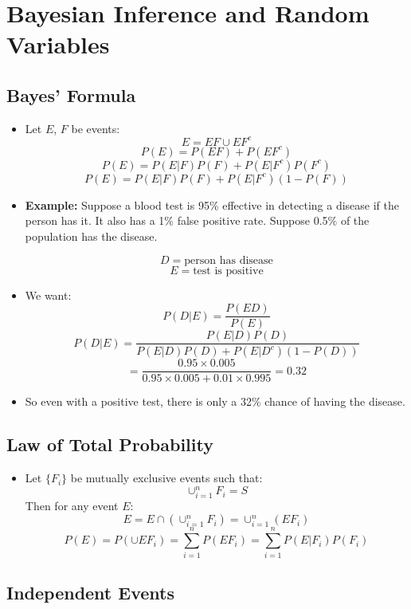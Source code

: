 \section{Bayesian Inference and Random Variables}

\subsection{Bayes' Formula}

\begin{itemize}
    \item Let $E$, $F$ be events:
          \[ E = EF \cup EF^c \]
          \[ P(E) = P(EF) + P(EF^c) \]
          \[ P(E) = P(E|F)P(F) + P(E|F^c)P(F^c) \]
          \[ P(E) = P(E|F)P(F) + P(E|F^c)(1 - P(F)) \]

    \item \textbf{Example:} Suppose a blood test is 95\% effective in detecting a disease if the person has it. It also has a 1\% false positive rate. Suppose 0.5\% of the population has the disease.

          \[ D = \text{person has disease} \]
          \[ E = \text{test is positive} \]

    \item We want:
          \[ P(D|E) = \frac{P(ED)}{P(E)} \]
          \[ P(D|E) = \frac{P(E|D)P(D)}{P(E|D)P(D) + P(E|D^c)(1 - P(D))} \]
          \[ = \frac{0.95 \times 0.005}{0.95 \times 0.005 + 0.01 \times 0.995} = 0.32 \]

    \item So even with a positive test, there is only a 32\% chance of having the disease.
\end{itemize}

\subsection{Law of Total Probability}

\begin{itemize}
    \item Let $\{F_i\}$ be mutually exclusive events such that:
          \[ \cup_{i=1}^n F_i = S \]
          Then for any event $E$:
          \[ E = E \cap \left( \cup_{i=1}^n F_i \right) = \cup_{i=1}^n (E F_i) \]
          \[ P(E) = P\left( \cup E F_i \right) = \sum_{i=1}^n P(E F_i) = \sum_{i=1}^n P(E|F_i)P(F_i) \]
\end{itemize}

\subsection{Independent Events}

